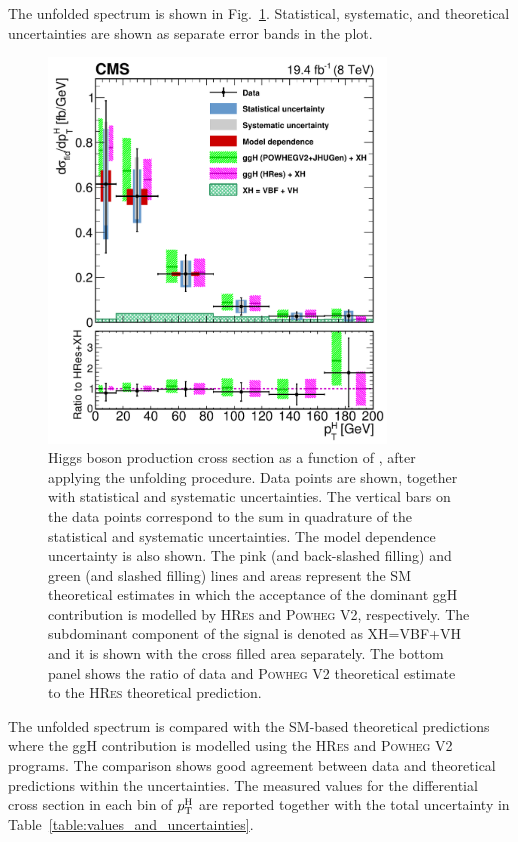 The unfolded \pth{} spectrum is shown in Fig.~\ref{fig:unfolded}. Statistical, systematic, and theoretical uncertainties are shown as separate error bands in the plot.
\begin{figure}[!h]
\centering
\includegraphics[width=0.8\textwidth]{images/unblinding/pthRatio_unfolded_paper.pdf}
\caption{Higgs boson production cross section as a function of \pth{}, after applying the unfolding procedure.
Data points are shown, together with statistical and systematic uncertainties. The vertical bars on the data points correspond to the sum in quadrature of the statistical and systematic uncertainties. The model dependence uncertainty is also shown.
The pink (and back-slashed filling) and green (and slashed filling) lines and areas represent the SM theoretical estimates in which the acceptance of the dominant ggH contribution is modelled by \textsc{HRes} and \textsc{Powheg V2}, respectively. The subdominant component of the signal is denoted as XH=VBF+VH and it is shown with the cross filled area separately. The bottom panel shows the ratio of data and \textsc{Powheg V2} theoretical estimate to the \textsc{HRes} theoretical prediction.}\label{fig:unfolded}
\end{figure}
The unfolded spectrum is compared with the SM-based theoretical predictions where the ggH contribution is modelled using the \textsc{HRes} and \textsc{Powheg V2} programs. The comparison shows good agreement between data and theoretical predictions within the uncertainties.
The measured values for the differential cross section in each bin of $p_{\rm T}^{\rm H}$ are reported together with the total uncertainty in Table~\ref{table:values_and_uncertainties}.

